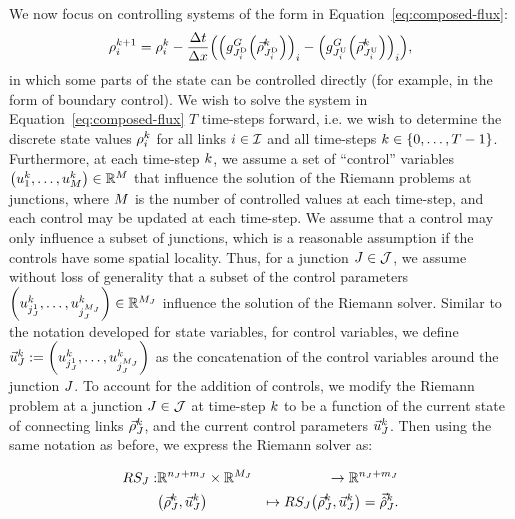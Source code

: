 We now focus on controlling systems of the form
in Equation~\eqref{eq:composed-flux}:
\[
\discrete{\link}{\tind+1}=\discrete{\link}{\tind}-\dfrac{\Delta t}{\Delta x}\left(\left(\god_{\jdown{\link}}\left(\juncstate{\jdown{\link}}{\tind}\right)\right)_{\link}-\left(\god_{\jup{\link}}\left(\juncstate{\jup{\link}}{\tind}\right)\right)_{\link}\right)\label{eq:composed-flux},
\]
in which some parts of the state
can be controlled directly (for example, in the form of boundary control).
We wish to solve the system in Equation~\eqref{eq:composed-flux} $T$
time-steps forward, i.e. we wish to determine the discrete state values
$\rho_{i}^{k}$ for all links $i\in\mathcal{I}$ and all
time-steps $\tind\in\intrange 0{\ntime-1}$. Furthermore, at each
time-step $k$, we assume a set of ``control'' variables $\tuple{\condiscrete 1{\tind}}{\condiscrete{\ncontrols}{\tind}}\in\mathbb{R}^{\ncontrols}$
that influence the solution of the Riemann problems at junctions,
where $M$ is the number of controlled values at each time-step,
and each control may be updated at each time-step. We assume that
a control may only influence a subset of junctions, which is a reasonable
assumption if the controls have some spatial locality. Thus, for a
junction $J\in\mathcal{J}$, we assume without loss of generality that
a subset of the control parameters $\tuple{\condiscrete{\cind_{\jn}^{1}}{\tind}}{\condiscrete{\cind_{\jn}^{\ncontrols_{\jn}}}{\tind}}\in\mathbb{R}^{\ncontrols_{\jn}}$
influence the solution of the Riemann solver. Similar to the notation
developed for state variables, for control variables, we define $\junccon{\jn}{\tind}\defeq\tuple{\condiscrete{\cind_{\jn}^{1}}{\tind}}{\condiscrete{\cind_{\jn}^{\ncontrols_{\jn}}}{\tind}}$
as the concatenation of the control variables around the junction
$J$. To account for the addition of controls, we modify the Riemann
problem at a junction $J\in\mathcal{J}$ at time-step $k$ to be a
function of the current state of connecting links $\vec{\rho}_{J}^{k}$,
and the current control parameters $\vec{u}_{J}^{k}$. Then using
the same notation as before, we express the Riemann solver as:

\begin{eqnarray*}
	\RS_{\jn}: & \mathbb{R}^{\ninc_{\jn}+\nout_{\jn}}\times\mathbb{R}^{\ncontrols_{\jn}} & \rightarrow\mathbb{R}^{\ninc_{\jn}+\nout_{\jn}}\\
	& \left(\juncstate{\jn}{\tind},\junccon{\jn}{\tind}\right) & \mapsto\RS_{\jn}\left(\juncstate{\jn}{\tind},\junccon{\jn}{\tind}\right)=\junctrace{\jn}{\tind}.
\end{eqnarray*}


